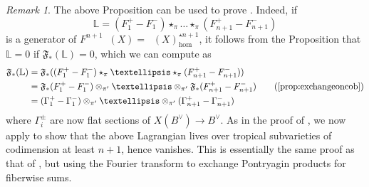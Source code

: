 \documentclass[10pt]{amsart}
\newcounter{mainthm}
\theoremstyle{definition}
\theoremstyle{remark}
\newtheorem{rmk}[thm]{Remark}
\DeclareMathOperator{\Cobfib}{\mathrm{Cob}_{\mathrm{fib}}}
\newcommand{\tx}[1]{\text{#1}}
\begin{document}
\begin{rmk}
    The above Proposition can be used to prove . 
    Indeed, if 
    $$
    \mathbb L = (F_1^+ - F_1^-) \star_{\pi} \dots \star_{\pi} (F_{n+1}^+ - F_{n+1}^-)
    $$ is a generator of $F^{n+1} \Cobfib(X) = \Cobfib(X)_{\hom}^{\star n+1}$, it follows from the Proposition that $\mathbb{L} = 0$ if $\mathfrak F_*(\mathbb{L}) = 0$, which we can compute as
    \begin{align*}
        \mathfrak F_*(\mathbb{L}) &= \mathfrak F_*((F_1^+ - F_1^-) \star_{\pi} \dots \star_{\pi} (F_{n+1}^+ - F_{n+1}^-))\\
        & = \mathfrak F_*(F_1^+ - F_1^-) \otimes_{\pi'} \dots \otimes_{\pi'} \mathfrak F_*(F_{n+1}^+ - F_{n+1}^-) \qquad \tx{(\Cref{prop:exchangeoncob})}\\
        &= (\Gamma_1^+ - \Gamma_1^-) \otimes_{\pi'} \dots \otimes_{\pi'} (\Gamma_{n+1}^+ - \Gamma_{n+1}^-)
    \end{align*}
    where $\Gamma_i^\pm$ are  now flat sections of $X(B^\vee) \to B^\vee$.
    As in the proof of , we now apply  to show that the above Lagrangian lives over tropical subvarieties of codimension at least $n+1$, hence vanishes.
    This is essentially the same proof as that of , but using the Fourier transform to exchange Pontryagin products for fiberwise sums.
\end{rmk} 










\def\bibrangedash{ -- }
\printbibliography
\end{document}
